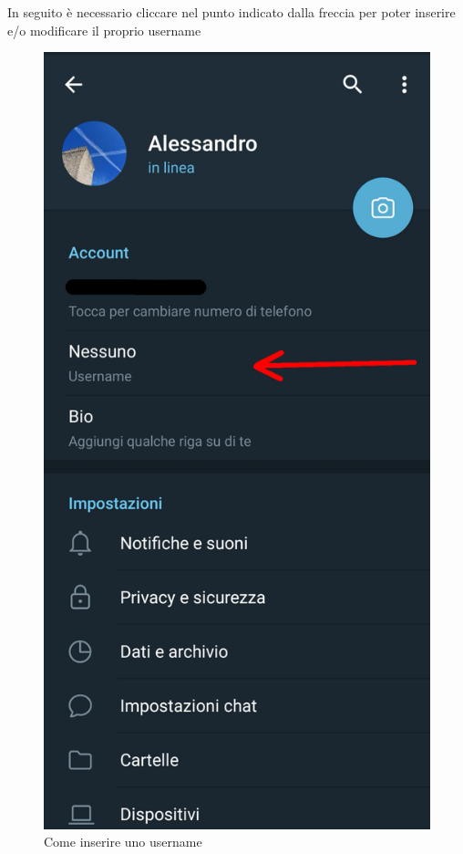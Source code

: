 	\newpage
	In seguito è necessario cliccare nel punto indicato dalla freccia per poter inserire e/o modificare il proprio username
	\begin{figure}[H]
		\centering
		\includegraphics[scale=0.100]{res/images/telegram2.jpg}
		\caption{Come inserire uno username}
		\label{Screenshot2}
	\end{figure}
